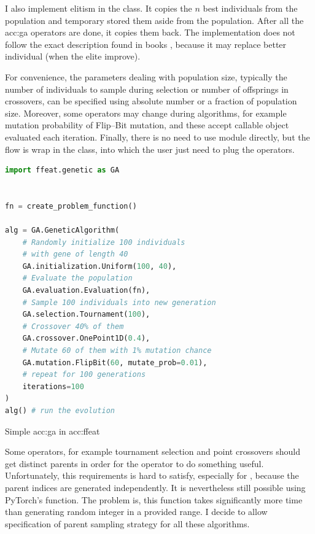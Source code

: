 I also implement elitism in the  class. It copies the $n$ best individuals from the population and temporary stored them aside from the population. After all the \acrshort{acc:ga} operators are done, it copies them back. The implementation does not follow the exact description found in books \citep{IntroductionToEA}, because it may replace better individual (when the elite improve).

For convenience, the parameters dealing with population size, typically the number of individuals to sample during selection or number of offsprings in crossovers, can be specified using absolute number or a fraction of population size. Moreover, some operators may change during algorithms, for example mutation probability of Flip--Bit mutation, and these accept callable object evaluated each iteration. Finally, there is no need to use  module directly, but the flow is wrap in the  class, into which the user just need to plug the operators.

\begin{algorithm}[t!]
\begin{lstlisting}[language=Python, xrightmargin=18pt]
import ffeat.genetic as GA


fn = create_problem_function()

alg = GA.GeneticAlgorithm(
    # Randomly initialize 100 individuals 
    # with gene of length 40
    GA.initialization.Uniform(100, 40),
    # Evaluate the population
    GA.evaluation.Evaluation(fn),
    # Sample 100 individuals into new generation
    GA.selection.Tournament(100),
    # Crossover 40% of them
    GA.crossover.OnePoint1D(0.4),
    # Mutate 60 of them with 1% mutation chance
    GA.mutation.FlipBit(60, mutate_prob=0.01),
    # repeat for 100 generations
    iterations=100
)
alg() # run the evolution
\end{lstlisting}
\caption{Simple \acrshort*{acc:ga} in \acrshort*{acc:ffeat}}
\label{alg:gaffeat}
\end{algorithm}

Some operators, for example tournament selection and point crossovers should get distinct parents in order for the operator to do something useful. Unfortunately, this requirements is hard to satisfy, especially for \gpuns, because the parent indices are generated independently. It is nevertheless still possible using PyTorch's  function. The problem is, this function takes significantly more time than generating random integer in a provided range. I decide to allow specification of parent sampling strategy for all these algorithms.

